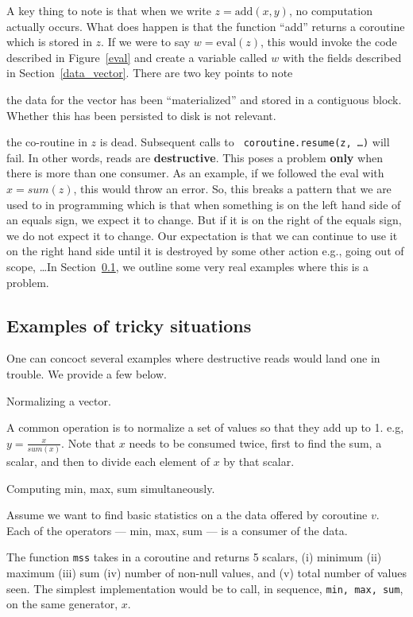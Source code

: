 A key thing to note is that when we write \(z = \mathrm{add}(x, y)\),
no computation actually occurs. What does happen is that the function
``add'' returns a coroutine which is stored in \(z\). If we were to
say \(w = \mathrm{eval}(z)\), this would invoke the code described in
Figure~\ref{eval} and create a variable called \(w\) with the fields
described in Section~\ref{data_vector}. There are two key points to
note
\be
\item the data for the vector has been ``materialized'' and stored in a contiguous
block. Whether this has been persisted to disk is not relevant.
\item the co-routine in \(z\) is dead. Subsequent calls to {\tt
coroutine.resume(z, \ldots)} will fail.
\ee
In other words, reads are {\bf destructive}. This 
poses a problem {\bf only} when there is more than one
consumer. As an example, if we followed the eval with \(x = sum(z)\),
this would throw an error. So, this breaks a pattern that we are used
to in programming which is that when something is on the left hand
side of an equals sign, we expect it to change. But if it is on the
right of the equals sign, we do not expect it to change. Our
expectation is that we can continue to use it on the right hand side
until it is destroyed by some other action e.g., going out of
scope, \ldots In Section~\ref{sticky_wicket}, we outline some very
real examples where this is a problem.

\subsection{Examples of tricky situations}
\label{sticky_wicket}

One can concoct several examples where destructive reads would land one in
trouble. We provide a few below. 
\be
\item Normalizing a vector. 

A common operation is to normalize a set of values so that they add up
to 1.  e.g, \(y = \frac{x}{sum(x)}\). Note that \(x\) needs to be
consumed twice, first to find the sum, a scalar, and then to divide
each element of \(x\) by that scalar.

\item Computing min, max, sum simultaneously.

Assume we want to find basic statistics on a the data offered by
coroutine \(v\). Each of the operators --- min, max, sum --- is a
consumer of the data.

The function {\tt mss} takes in a coroutine and returns 5 scalars,
(i) minimum (ii) maximum (iii) sum (iv) number of non-null values, and (v) 
total number of values seen. The simplest implementation would be to call, in
sequence, {\tt min, max, sum}, on the same generator, \(x\).

